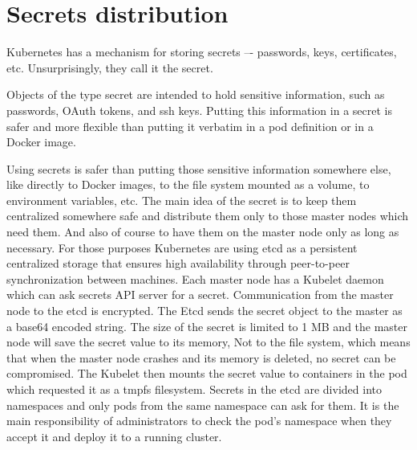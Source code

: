 \chapter{Secrets distribution}

Kubernetes has a mechanism for storing secrets –- passwords, keys, certificates, etc. Unsurprisingly, they call it the secret.

Objects of the type secret are intended to hold sensitive information, such as passwords, OAuth tokens, and ssh keys. Putting this information in a secret is safer and more flexible than putting it verbatim in a pod definition or in a Docker image. \cite{secrets} 

Using secrets is safer than putting those sensitive information somewhere else, like directly to Docker images, to the file system mounted as a volume, to environment variables, etc. The main idea of the secret is to keep them centralized somewhere safe and distribute them only to those master nodes which need them. And also of course to have them on the master node only as long as necessary. For those purposes Kubernetes are using etcd as a persistent centralized storage that ensures high availability through peer-to-peer synchronization between machines. Each master node has a Kubelet daemon which can ask secrets API server for a secret. Communication from the master node to the etcd is encrypted. The Etcd sends the secret object to the master as a base64 encoded string. The size of the secret is limited to 1 MB and the master node will save the secret value to its memory, Not to the file system, which means that when the master node crashes and its memory is deleted, no secret can be compromised. The Kubelet then mounts the secret value to containers in the pod which requested it as a tmpfs filesystem. Secrets in the etcd are divided into namespaces and only pods from the same namespace can ask for them. It is the main responsibility of administrators to check the pod’s namespace when they accept it and deploy it to a running cluster.

